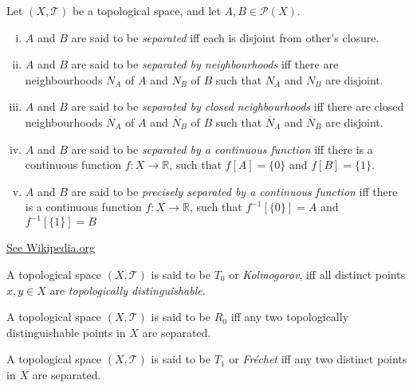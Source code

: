 \begin{definition}
	Let $(X, \mathcal T)$ be a topological space, and let $A, B \in \mathcal P(X)$.
	
	\begin{enumerate}[(i)]
		\item $A$ and $B$ are said to be \textit{separated} iff each is disjoint from other's closure.
		\item $A$ and $B$ are said to be \textit{separated by neighbourhoods} iff there are neighbourhoods $N_A$ of $A$ and $N_B$ of $B$ such that $N_A$ and $N_B$ are disjoint.
		\item $A$ and $B$ are said to be \textit{separated by closed neighbourhoods} iff there are closed neighbourhoods $\overline N_A$ of $A$ and $\overline N_B$ of $B$ such that $\overline N_A$ and $\overline N_B$ are disjoint.
		\item $A$ and $B$ are said to be \textit{separated by a continuous function} iff there is a continuous function $f: X \to \mathbb R$, such that $f[A] = \{0\}$ and $f[B] = \{1\}$.
		\item $A$ and $B$ are said to be \textit{precisely separated by a continuous function} iff there is a continuous function $f: X \to \mathbb R$, such that $f^{-1}[\{0\}] = A$ and $f^{-1}[\{1\}] = B$
	\end{enumerate}
\end{definition}


\href{https://en.wikipedia.org/wiki/Separated_sets}{See Wikipedia.org}


\begin{definition}
	[$T_0$ spaces]
	\label{def: T_1 spaces}
	A topological space $(X, \mathcal T)$ is said to be $T_0$ or \textit{Kolmogorov}, iff all distinct points $x,y \in X$ are \textit{topologically distinguishable}.
\end{definition}


\begin{definition}
	[$R_0$ spaces]
	\label{def: R_0 spaces}
	A topological space $(X, \mathcal T)$ is said to be $R_0$ iff any two topologically distinguishable points in $X$ are separated.
\end{definition}


\begin{definition}
	[$T_1$ spaces]
	\label{def: T_1 spaces}
	A topological space $(X, \mathcal T)$ is said to be $T_1$ or \textit{Fr\'echet} iff any two distinct points in $X$ are separated.
\end{definition}


